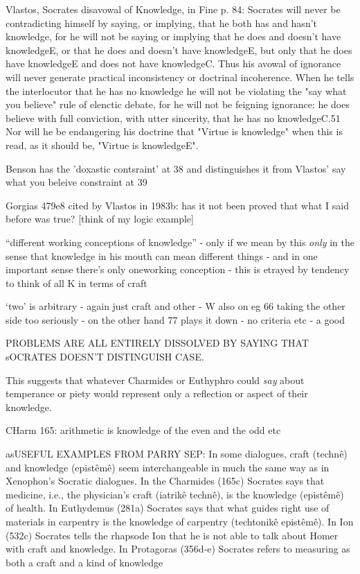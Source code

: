 \documentclass[11pt,letterpaper,oneside]{amsart} %
\begin{document}
Vlastos, Socrates disavowal of Knowledge, in Fine p. 84: Socrates will never be contradicting himself by saying, or implying, that he both has and hasn't knowledge, for he will not be saying or implying that he does and doesn't have knowledgeE, or that he does and doesn't have knowledgeE, but only that he does have knowledgeE and does not have knowledgeC. Thus his avowal of ignorance will never generate practical inconsistency or doctrinal incoherence. When he tells the interlocutor that he has no knowledge he will not be violating the "say what you believe" rule of elenctic debate, for he will not be feigning ignorance: he does believe with full conviction, with utter sincerity, that he has no knowledgeC.51 Nor will he be endangering his doctrine that "Virtue is knowledge" when this is read, as it should be, "Virtue is
knowledgeE".






Benson has the 'doxastic contsraint' at 38 and distinguishes it from Vlastos' say what you beleive constraint at 39

Gorgias 479e8 cited by Vlastos in 1983b: has it not been proved that what I said before was true? [think of my logic example]

``different working conceptions of knowledge'' - only if we mean by this \emph{only} in the sense that knowledge in his mouth can mean different things - and in one important sense there's only oneworking conception - this is etrayed by tendency to think of all K in terms of craft

`two' is arbitrary - again just craft and other - W also on eg 66 taking the other side too seriously - on the other hand 77 plays it down - no criteria etc - a good



PROBLEMS ARE ALL ENTIRELY DISSOLVED BY SAYING THAT sOCRATES DOESN'T DISTINGUISH CASE.

This suggests that whatever Charmides or Euthyphro could \emph{say} about temperance or piety would represent only a reflection or aspect of their knowledge.

CHarm 165: arithmetic is knowledge of the even and the odd etc

asUSEFUL EXAMPLES FROM PARRY SEP: In some dialogues, craft (technê) and knowledge (epistêmê) seem interchangeable in much the same way as in Xenophon's Socratic dialogues. In the Charmides (165c) Socrates says that medicine, i.e., the physician's craft (iatrikê technê), is the knowledge (epistêmê) of health. In Euthydemus (281a) Socrates says that what guides right use of materials in carpentry is the knowledge of carpentry (techtonikê epistêmê). In Ion (532c) Socrates tells the rhapsode Ion that he is not able to talk about Homer with craft and knowledge. In Protagoras (356d-e) Socrates refers to measuring as both a craft and a kind of knowledge
\end{document}
